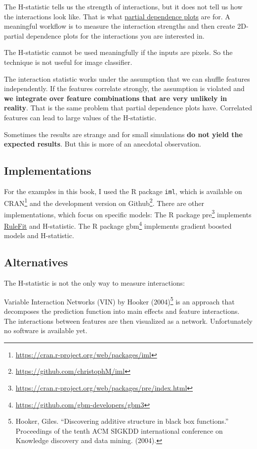 \documentclass[
  11pt,
]{scrbook}
\renewcommand{\href}[2]{#2\footnote{\url{#1}}}
\begin{document}
The H-statistic tells us the strength of interactions, but it does not tell us how the interactions look like.
That is what \protect\hyperlink{pdp}{partial dependence plots} are for.
A meaningful workflow is to measure the interaction strengths and then create 2D-partial dependence plots for the interactions you are interested in.

The H-statistic cannot be used meaningfully if the inputs are pixels.
So the technique is not useful for image classifier.

The interaction statistic works under the assumption that we can shuffle features independently.
If the features correlate strongly, the assumption is violated and \textbf{we integrate over feature combinations that are very unlikely in reality}.
That is the same problem that partial dependence plots have.
Correlated features can lead to large values of the H-statistic.

Sometimes the results are strange and for small simulations \textbf{do not yield the expected results}.
But this is more of an anecdotal observation.

\hypertarget{implementations}{%
\subsection{Implementations}\label{implementations}}

For the examples in this book, I used the R package \texttt{iml}, which is available on \href{https://cran.r-project.org/web/packages/iml}{CRAN} and the development version on \href{https://github.com/christophM/iml}{Github}.
There are other implementations, which focus on specific models:
The R package \href{https://cran.r-project.org/web/packages/pre/index.html}{pre} implements \protect\hyperlink{rulefit}{RuleFit} and H-statistic.
The R package \href{https://github.com/gbm-developers/gbm3}{gbm} implements gradient boosted models and H-statistic.

\hypertarget{alternatives}{%
\subsection{Alternatives}\label{alternatives}}

The H-statistic is not the only way to measure interactions:

Variable Interaction Networks (VIN) by Hooker (2004)\footnote{Hooker, Giles. ``Discovering additive structure in black box functions.'' Proceedings of the tenth ACM SIGKDD international conference on Knowledge discovery and data mining. (2004).} is an approach that decomposes the prediction function into main effects and feature interactions.
The interactions between features are then visualized as a network.
Unfortunately no software is available yet.
\end{document}
